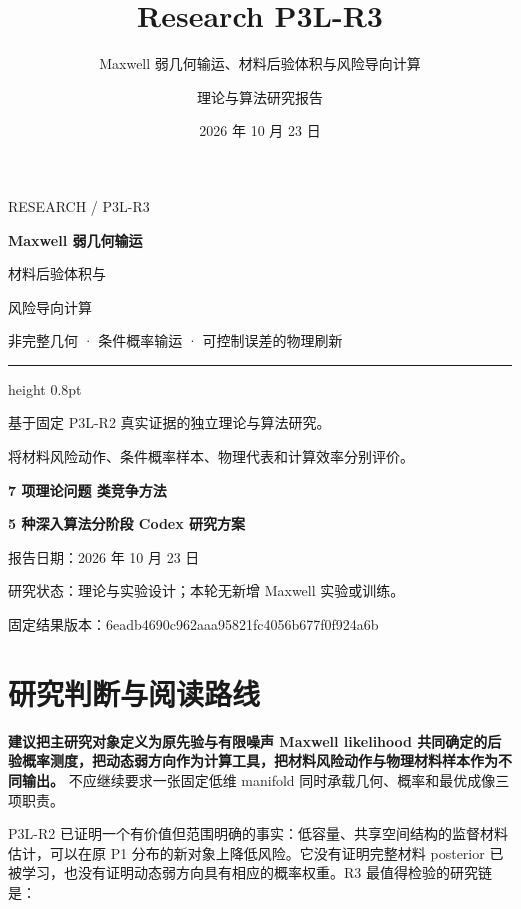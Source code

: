 \documentclass[
  11pt,
  a4paper,
]{article}
\title{Research P3L-R3}
\subtitle{Maxwell 弱几何输运、材料后验体积与风险导向计算}
\author{理论与算法研究报告}
\date{2026 年 10 月 23 日}
\begin{document}
\begin{titlepage}
\thispagestyle{empty}
\vspace*{19mm}
{\sffamily\color{accent}\large RESEARCH / P3L-R3\par}
\vspace{9mm}
{\fontsize{27}{38}\selectfont\bfseries\color{ink} Maxwell 弱几何输运\par 材料后验体积与\par 风险导向计算\par}
\vspace{10mm}
{\large 非完整几何 · 条件概率输运 · 可控制误差的物理刷新\par}
\vspace{8mm}
{\color{rulegray}\hrule height 0.8pt}
\vspace{9mm}
{\normalsize
基于固定 P3L-R2 真实证据的独立理论与算法研究。\par
将材料风险动作、条件概率样本、物理代表和计算效率分别评价。\par
}
\vspace{12mm}
{\large\bfseries 7 项理论问题 类竞争方法\par}
\vspace{3mm}
{\large\bfseries 5 种深入算法\quad 分阶段 Codex 研究方案\par}
\vfill
{\normalsize 报告日期：2026 年 10 月 23 日\par}
{\small 研究状态：理论与实验设计；本轮无新增 Maxwell 实验或训练。\par}
\vspace{5mm}
{\footnotesize 固定结果版本：6eadb4690c962aaa95821fc4056b677f0f924a6b\par}
\end{titlepage}


\renewcommand*\contentsname{目录}
{
\hypersetup{linkcolor=ink}
\setcounter{tocdepth}{2}
\tableofcontents
\clearpage
}
\hypertarget{ux7814ux7a76ux5224ux65adux4e0eux9605ux8bfbux8defux7ebf}{%
\section{研究判断与阅读路线}\label{ux7814ux7a76ux5224ux65adux4e0eux9605ux8bfbux8defux7ebf}}

\textbf{建议把主研究对象定义为原先验与有限噪声 Maxwell likelihood
共同确定的后验概率测度，把动态弱方向作为计算工具，把材料风险动作与物理材料样本作为不同输出。}
不应继续要求一张固定低维 manifold 同时承载几何、概率和最优成像三项职责。

P3L-R2
已证明一个有价值但范围明确的事实：低容量、共享空间结构的监督材料估计，可以在原
P1 分布的新对象上降低风险。它没有证明完整材料 posterior
已被学习，也没有证明动态弱方向具有相应的概率权重。R3
最值得检验的研究链是：
\end{document}
